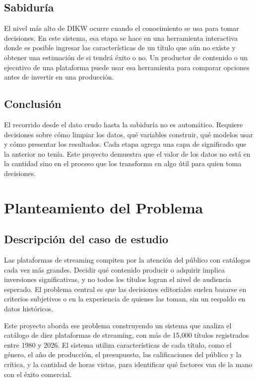 \documentclass[12pt,a4paper]{article}
\begin{document}
\subsection*{Sabidur\'ia}

El nivel m\'as alto de DIKW ocurre cuando el conocimiento se usa para tomar decisiones. En este sistema, esa etapa se hace en una herramienta interactiva donde es posible ingresar las caracter\'isticas de un t\'itulo que a\'un no existe y obtener una estimaci\'on de si tendr\'a \'exito o no. Un productor de contenido o un ejecutivo de una plataforma puede usar esa herramienta para comparar opciones antes de invertir en una producci\'on. 

\subsection*{Conclusi\'on}

El recorrido desde el dato crudo hasta la sabidur\'ia no es autom\'atico. Requiere decisiones sobre c\'omo limpiar los datos, qu\'e variables construir, qu\'e modelos usar y c\'omo presentar los resultados. Cada etapa agrega una capa de significado que la anterior no ten\'ia. Este proyecto demuestra que el valor de los datos no est\'a en la cantidad sino en el proceso que los transforma en algo \'util para quien toma decisiones.

\newpage
\section*{Planteamiento del Problema}

\subsection*{Descripci\'on del caso de estudio}

Las plataformas de streaming compiten por la atenci\'on del p\'ublico con cat\'alogos cada vez m\'as grandes. Decidir qu\'e contenido producir o adquirir implica inversiones significativas, y no todos los t\'itulos logran el nivel de audiencia esperado. El problema central es que las decisiones editoriales suelen basarse en criterios subjetivos o en la experiencia de quienes las toman, sin un respaldo en datos hist\'oricos.

Este proyecto aborda ese problema construyendo un sistema que analiza el cat\'alogo de diez plataformas de streaming, con m\'as de 15{,}000 t\'itulos registrados entre 1980 y 2026. El sistema utiliza caracter\'isticas de cada t\'itulo, como el g\'enero, el a\~no de producci\'on, el presupuesto, las calificaciones del p\'ublico y la cr\'itica, y la cantidad de horas vistas, para identificar qu\'e factores van de la mano con el \'exito comercial.
\end{document}
